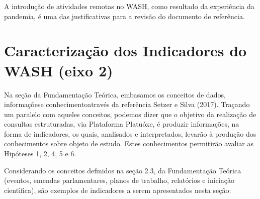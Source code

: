 \documentclass[
12pt,		%
openright,	%
twoside,  %
a4paper,			%
chapter=TITLE,		%
english,			%
french,				%
spanish,			%
brazil				%
]{USPSC-classe/USPSC}
\begin{document}
A introdu\c{c}\~ao de atividades remotas no WASH, como resultado da experi\^encia da pandemia, \'e uma das justificativas para a revis\~ao do documento de refer\^encia.

















\section[Caracteriza\c{c}\~ao dos Indicadores do WASH (eixo 2)]{Caracteriza\c{c}\~ao dos Indicadores do WASH (eixo 2)}\label{Caracteriza\c{c}\~ao dos Indicadores do WASH (eixo 2)}
Na se\c{c}\~ao da Fundamenta\c{c}\~ao Te\'orica, embasamos os conceitos de \textquotedbl dados\textquotedbl , \textquotedbl informa\c{c}\~oes\textquotedbl  e \textquotedbl conhecimento\textquotedbl   atrav\'es da refer\^encia  Setzer e Silva (2017). Tra\c{c}ando um paralelo com aqueles conceitos, podemos dizer que o objetivo da realiza\c{c}\~ao de consultas estruturadas, via Plataforma \textquotedbl Platu\'oxe\textquotedbl , \'e produzir informa\c{c}\~oes, na forma de indicadores, os quais, analisados e interpretados, levar\~ao \`a produ\c{c}\~ao dos conhecimentos sobre objeto de estudo. Estes conhecimentos permitir\~ao avaliar as Hip\'oteses 1, 2, 4, 5 e 6.

















Considerando os conceitos definidos na se\c{c}\~ao 2.3, da Fundamenta\c{c}\~ao Te\'orica (eventos, emendas parlamentares, planos de trabalho, relat\'orios e inicia\c{c}\~ao cient\'{\i}fica), s\~ao exemplos de indicadores a serem apresentados nesta se\c{c}\~ao:
\end{document}
